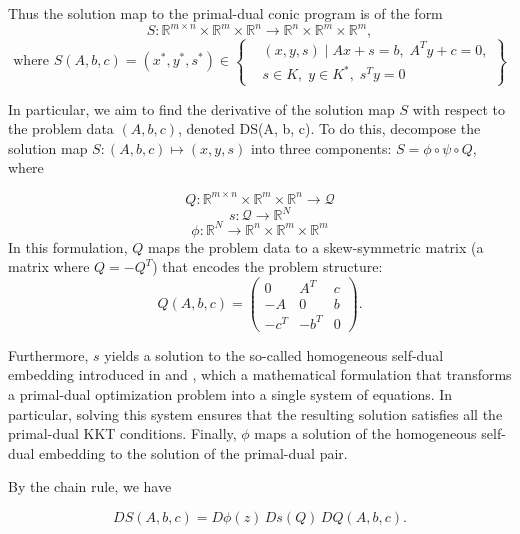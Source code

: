 \documentclass{article}
\begin{document}
Thus the solution map to the primal-dual conic program is of the form 
\[
S: \mathbb{R}^{m \times n} \times \mathbb{R}^m \times \mathbb{R}^n \to \mathbb{R}^n \times \mathbb{R}^m \times \mathbb{R}^m,
\]
\[
\text{where } S(A, b, c) = (x^*, y^*, s^*) \in 
\left\{
\begin{aligned}
    & (x, y, s) \mid A x + s = b, \; A^T y + c = 0, \\
    & s \in K, \; y \in K^*, \; s^T y = 0
\end{aligned}
\right\}
\]

In particular, we aim to find the derivative of the solution map \(S\) with respect to the problem data \((A, b, c)\), denoted DS(A, b, c). To do this, decompose the solution map \(S: (A,b,c) \mapsto (x,y,s)\) into three components: \(S = \phi \circ \psi \circ Q\), where

\[
Q : \mathbb{R}^{m \times n} \times \mathbb{R}^m \times \mathbb{R}^n \to \mathcal{Q}
\]
\[
s : \mathcal{Q} \to \mathbb{R}^N
\]
\[
\phi : \mathbb{R}^N \to \mathbb{R}^n \times \mathbb{R}^m \times \mathbb{R}^m
\]In this formulation, $Q$ maps the problem data to a skew-symmetric matrix (a matrix where \(Q = -Q^T\)) that encodes the problem structure:
\begin{equation}
Q(A,b,c) = \begin{pmatrix} 
0 & A^T & c \\
-A & 0 & b \\
-c^T & -b^T & 0
\end{pmatrix}.
\end{equation}

Furthermore, $s$ yields a solution to the so-called homogeneous self-dual embedding introduced in \citep{Yeselfdualemb} and \citep{Xuselfdualemb}, which a mathematical formulation  that transforms a primal-dual optimization problem into a single system of equations. In particular, solving this system ensures that the resulting solution satisfies all the primal-dual KKT conditions. Finally, $\phi$ maps a solution of the homogeneous self-dual embedding to the solution of the primal-dual pair. 

By the chain rule, we have 

\[
DS(A, b, c) = D\phi(z) \, Ds(Q) \, DQ(A, b, c).
\]
\end{document}
